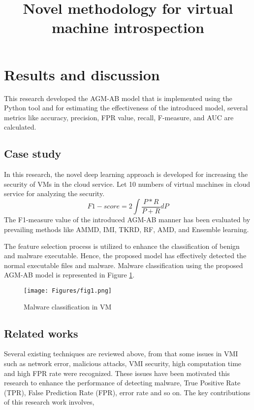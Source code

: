 \documentclass[acmtog]{acmart}
\begin{document}
\tableofcontents
\newpage

\title{Novel methodology for virtual machine introspection}

\section{Results and discussion }
This research developed the AGM-AB model that is implemented using the Python tool and for estimating the effectiveness of the introduced model, several metrics like accuracy, precision, FPR value, recall, F-measure, and AUC are calculated.

\subsection{Case study}
In this research, the novel deep learning approach is developed for increasing the security of VMs in the cloud service. Let 10 numbers of virtual machines in cloud service for analyzing the security. 
$$
F1 - score= 2 \int \frac{P*R}{P+R}dP
$$
The F1-measure value of the introduced AGM-AB manner has been evaluated by prevailing methods like AMMD, IMI, TKRD, RF, AMD, and Ensemble learning.
\par The feature selection process is utilized to enhance the classification of benign and malware executable. Hence, the proposed model has effectively detected the normal executable files and malware. Malware classification using the proposed AGM-AB model is represented in Figure \ref{Figure 1:image}.
\begin{figure}[h]
  \centering
  \texttt{[image: Figures/fig1.png]}
  \caption{Malware classification in VM}
  \label{Figure 1:image}
\end{figure}

\subsection{Related works}
Several existing techniques are reviewed above, from that some issues in VMI such as network error, malicious attacks, VMI security, high computation time and high FPR rate were recognized. These issues have been motivated this research to enhance the performance of detecting malware, True Positive Rate (TPR), False Prediction Rate (FPR), error rate and so on. The key contributions of this research work involves,
\end{document}
